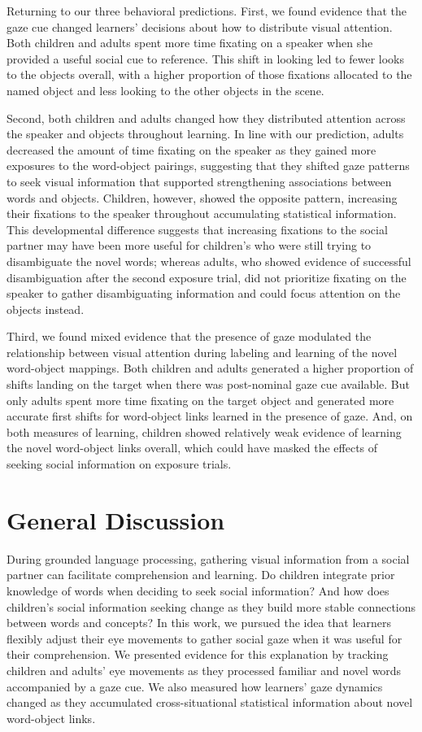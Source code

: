 \documentclass[oneside]{report}
\begin{document}
Returning to our three behavioral predictions. First, we found evidence
that the gaze cue changed learners' decisions about how to distribute
visual attention. Both children and adults spent more time fixating on a
speaker when she provided a useful social cue to reference. This shift
in looking led to fewer looks to the objects overall, with a higher
proportion of those fixations allocated to the named object and less
looking to the other objects in the scene.

Second, both children and adults changed how they distributed attention
across the speaker and objects throughout learning. In line with our
prediction, adults decreased the amount of time fixating on the speaker
as they gained more exposures to the word-object pairings, suggesting
that they shifted gaze patterns to seek visual information that
supported strengthening associations between words and objects.
Children, however, showed the opposite pattern, increasing their
fixations to the speaker throughout accumulating statistical
information. This developmental difference suggests that increasing
fixations to the social partner may have been more useful for children's
who were still trying to disambiguate the novel words; whereas adults,
who showed evidence of successful disambiguation after the second
exposure trial, did not prioritize fixating on the speaker to gather
disambiguating information and could focus attention on the objects
instead.

Third, we found mixed evidence that the presence of gaze modulated the
relationship between visual attention during labeling and learning of
the novel word-object mappings. Both children and adults generated a
higher proportion of shifts landing on the target when there was
post-nominal gaze cue available. But only adults spent more time
fixating on the target object and generated more accurate first shifts
for word-object links learned in the presence of gaze. And, on both
measures of learning, children showed relatively weak evidence of
learning the novel word-object links overall, which could have masked
the effects of seeking social information on exposure trials.

\section{General Discussion}\label{general-discussion-2}

During grounded language processing, gathering visual information from a
social partner can facilitate comprehension and learning. Do children
integrate prior knowledge of words when deciding to seek social
information? And how does children's social information seeking change
as they build more stable connections between words and concepts? In
this work, we pursued the idea that learners flexibly adjust their eye
movements to gather social gaze when it was useful for their
comprehension. We presented evidence for this explanation by tracking
children and adults' eye movements as they processed familiar and novel
words accompanied by a gaze cue. We also measured how learners' gaze
dynamics changed as they accumulated cross-situational statistical
information about novel word-object links.
\end{document}
